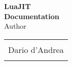 \begin{titlepage}

\begin{center}


\vspace*{150px}

\huge \textbf {LuaJIT}\\
\LARGE \textbf {Documentation}\\[0.5in]


\normalsize Author \\
\begin{table}[h]
\centering
\begin{tabular}{c}
\hline \\
Dario d'Andrea \\
\\ \hline 
\end{tabular}
\end{table}




\end{center}

\end{titlepage}